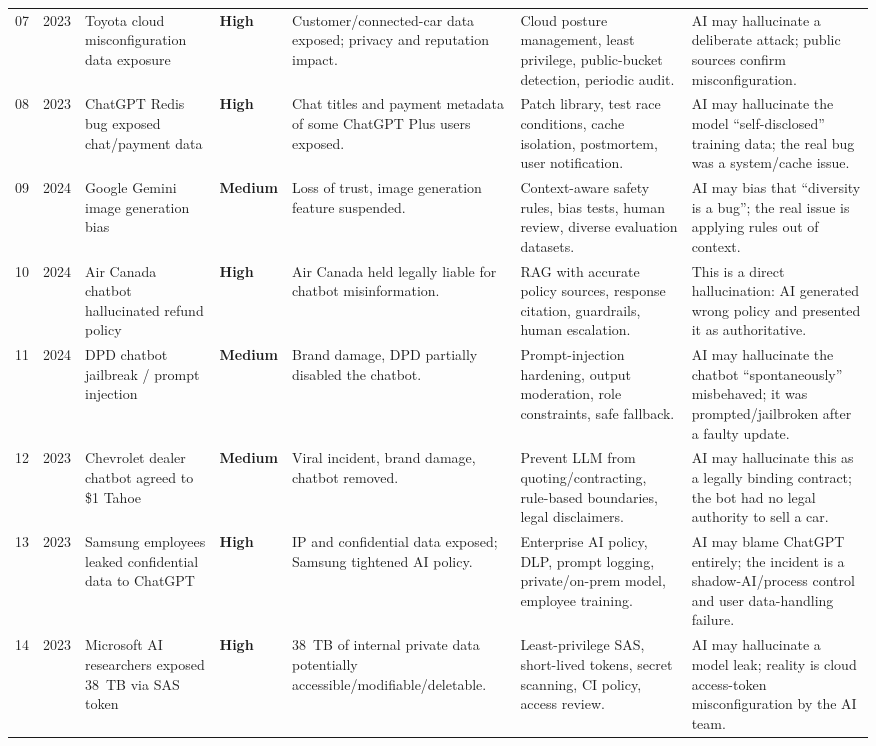 \documentclass[12pt, a4paper]{article}
\newcommand{\shigh}{\textcolor{HighSev}{\textbf{High}}}
\newcommand{\smed}{\textcolor{MedSev}{\textbf{Medium}}}
\begin{document}
{\begin{longtable}{@{} C{0.6cm} C{0.7cm} L{2.8cm} L{2.6cm} L{2.4cm} L{2.4cm} L{2.5cm} @{}}
07 & 2023 & Toyota cloud misconfiguration data exposure & \shigh & Customer/connected-car data exposed; privacy and reputation impact. & Cloud posture management, least privilege, public-bucket detection, periodic audit. & AI may hallucinate a deliberate attack; public sources confirm misconfiguration. \\
08 & 2023 & ChatGPT Redis bug exposed chat/payment data & \shigh & Chat titles and payment metadata of some ChatGPT Plus users exposed. & Patch library, test race conditions, cache isolation, postmortem, user notification. & AI may hallucinate the model ``self-disclosed'' training data; the real bug was a system/cache issue. \\
09 & 2024 & Google Gemini image generation bias & \smed & Loss of trust, image generation feature suspended. & Context-aware safety rules, bias tests, human review, diverse evaluation datasets. & AI may bias that ``diversity is a bug''; the real issue is applying rules out of context. \\
10 & 2024 & Air Canada chatbot hallucinated refund policy & \shigh & Air Canada held legally liable for chatbot misinformation. & RAG with accurate policy sources, response citation, guardrails, human escalation. & This is a direct hallucination: AI generated wrong policy and presented it as authoritative. \\
11 & 2024 & DPD chatbot jailbreak / prompt injection & \smed & Brand damage, DPD partially disabled the chatbot. & Prompt-injection hardening, output moderation, role constraints, safe fallback. & AI may hallucinate the chatbot ``spontaneously'' misbehaved; it was prompted/jailbroken after a faulty update. \\
12 & 2023 & Chevrolet dealer chatbot agreed to \$1 Tahoe & \smed & Viral incident, brand damage, chatbot removed. & Prevent LLM from quoting/contracting, rule-based boundaries, legal disclaimers. & AI may hallucinate this as a legally binding contract; the bot had no legal authority to sell a car. \\
13 & 2023 & Samsung employees leaked confidential data to ChatGPT & \shigh & IP and confidential data exposed; Samsung tightened AI policy. & Enterprise AI policy, DLP, prompt logging, private/on-prem model, employee training. & AI may blame ChatGPT entirely; the incident is a shadow-AI/process control and user data-handling failure. \\
14 & 2023 & Microsoft AI researchers exposed 38~TB via SAS token & \shigh & 38~TB of internal private data potentially accessible/modifiable/deletable. & Least-privilege SAS, short-lived tokens, secret scanning, CI policy, access review. & AI may hallucinate a model leak; reality is cloud access-token misconfiguration by the AI team. \\

\end{longtable}}
\end{document}

